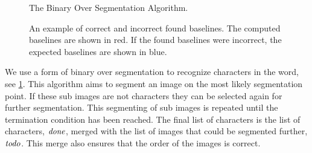 \newcommand{\body}{\ensuremath{\t{body}}\xspace}
\newcommand{\strokewidth}{\ensuremath{\t{stroke\_w}}\xspace}
\newcommand{\segmentationpoints}{\ensuremath{\t{sps}}\xspace}
\newcommand{\segmentationpoint}{\ensuremath{\t{sp}}\xspace}
\newcommand{\image}{\ensuremath{\t{image}}\xspace}
\newcommand{\subimage}{\ensuremath{\t{sub\_image}}\xspace}
\newcommand{\leftsubimage}{\ensuremath{\t{left}}\xspace}
\newcommand{\rightsubimage}{\ensuremath{\t{right}}\xspace}
\newcommand{\segmentfurther}{\ensuremath{\t{todo}}\xspace}
\newcommand{\characters}{\ensuremath{\t{done}}\xspace}
\newcommand{\parameters}{\ensuremath{\t{parameters}}\xspace}

\begin{figure}[t]
	
	\caption{The Binary Over Segmentation Algorithm.}
	\label{alg:method:segmentation:algorithm}
\end{figure}

\begin{figure}[t]
	\centering
	\hspace{0.05\columnwidth}
	\caption{An example of \protect{} correct and \protect{} incorrect found baselines. The computed baselines are shown in red. If the found baselines were incorrect, the expected baselines are shown in blue.}
	\label{fig:method:segmentation:baseline}
\end{figure}

We use a form of binary over segmentation to recognize characters in the word, see \cref{alg:method:segmentation:algorithm}. This algorithm aims to segment an image on the most likely segmentation point. If these sub images are not characters they can be selected again for further segmentation. This segmenting of sub images is repeated until the termination condition has been reached. The final list of characters is the list of characters, \characters, merged with the list of images that could be segmented further, \segmentfurther. This merge also ensures that the order of the images is correct.

